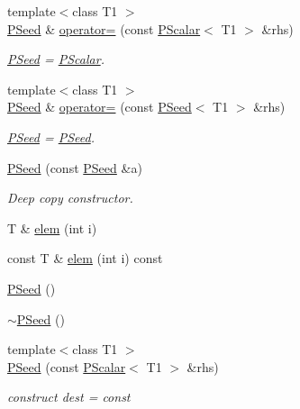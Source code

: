 \begin{DoxyCompactItemize}
{\footnotesize template$<$class T1 $>$ }\\\mbox{\hyperlink{classENSEM_1_1PSeed}{P\+Seed}} \& \mbox{\hyperlink{classENSEM_1_1PSeed_aa7d9ec1f6a7cca8ee109c29d75482350}{operator=}} (const \mbox{\hyperlink{classENSEM_1_1PScalar}{P\+Scalar}}$<$ T1 $>$ \&rhs)
\begin{DoxyCompactList}\small\item\em \mbox{\hyperlink{classENSEM_1_1PSeed}{P\+Seed}} = \mbox{\hyperlink{classENSEM_1_1PScalar}{P\+Scalar}}. \end{DoxyCompactList}\item 
{\footnotesize template$<$class T1 $>$ }\\\mbox{\hyperlink{classENSEM_1_1PSeed}{P\+Seed}} \& \mbox{\hyperlink{classENSEM_1_1PSeed_a22c88645227bfddbfea703ed71117795}{operator=}} (const \mbox{\hyperlink{classENSEM_1_1PSeed}{P\+Seed}}$<$ T1 $>$ \&rhs)
\begin{DoxyCompactList}\small\item\em \mbox{\hyperlink{classENSEM_1_1PSeed}{P\+Seed}} = \mbox{\hyperlink{classENSEM_1_1PSeed}{P\+Seed}}. \end{DoxyCompactList}\item 
\mbox{\hyperlink{classENSEM_1_1PSeed_a3a38a0e42c0c2ed2996eff03e32eebdc}{P\+Seed}} (const \mbox{\hyperlink{classENSEM_1_1PSeed}{P\+Seed}} \&a)
\begin{DoxyCompactList}\small\item\em Deep copy constructor. \end{DoxyCompactList}\item 
T \& \mbox{\hyperlink{classENSEM_1_1PSeed_aeed16139a22df65e16fd064b7808c49a}{elem}} (int i)
\item 
const T \& \mbox{\hyperlink{classENSEM_1_1PSeed_aa9151226aec3137be3417bbf36f770aa}{elem}} (int i) const
\item 
\mbox{\hyperlink{classENSEM_1_1PSeed_a23818769d84caba2047eaf425f2073f1}{P\+Seed}} ()
\item 
\mbox{\hyperlink{classENSEM_1_1PSeed_a6796252e24ea4c2ec43bf2600f2ffdc7}{$\sim$\+P\+Seed}} ()
\item 
{\footnotesize template$<$class T1 $>$ }\\\mbox{\hyperlink{classENSEM_1_1PSeed_a0c2df1585f47479069319dd97de9c4ea}{P\+Seed}} (const \mbox{\hyperlink{classENSEM_1_1PScalar}{P\+Scalar}}$<$ T1 $>$ \&rhs)
\begin{DoxyCompactList}\small\item\em construct dest = const \end{DoxyCompactList}\item 

\end{DoxyCompactItemize}

